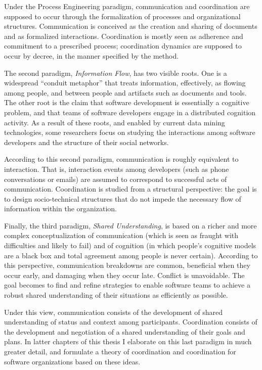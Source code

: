 Under the Process Engineering paradigm, communication and coordination are supposed to occur through the formalization of processes and organizational structures. Communication is conceived as the creation and sharing of documents and as formalized interactions. Coordination is mostly seen as adherence and commitment to a prescribed process; coordination dynamics are supposed to occur by decree, in the manner specified by the method.

The second paradigm, \emph{Information Flow}, has two visible roots. One is a widespread ``conduit metaphor'' that treats information, effectively, as flowing among people, and between people and artifacts such as documents and tools. The other root is the claim that software development is essentially a cognitive problem, and that teams of software developers engage in a distributed cognition activity. As a result of these roots, and enabled by current data mining technologies, some researchers focus on studying the interactions among software developers and the structure of their social networks.

According to this second paradigm, communication is roughly equivalent to interaction. That is, interaction events among developers (such as phone conversations or emails) are assumed to correspond to successful acts of communication. Coordination is studied from a structural perspective: the goal is to design socio-technical structures that do not impede the necessary flow of information within the organization.

Finally, the third paradigm, \emph{Shared Understanding}, is based on a richer and more complex conceptualization of communication (which is seen as fraught with difficulties and likely to fail) and of cognition (in which people's cognitive models are a black box and total agreement among people is never certain). According to this perspective, communication breakdowns are common, beneficial when they occur early, and damaging when they occur late. Conflict is unavoidable. The goal becomes to find and refine strategies to enable software teams to achieve a robust shared understanding of their situations as efficiently as possible.

Under this view, communication consists of the development of shared understanding of status and context among participants. Coordination consists of the development and negotiation of a shared understanding of their goals and plans. In latter chapters of this thesis I elaborate on this last paradigm in much greater detail, and formulate a theory of coordination and coordination for software organizations based on these ideas.

